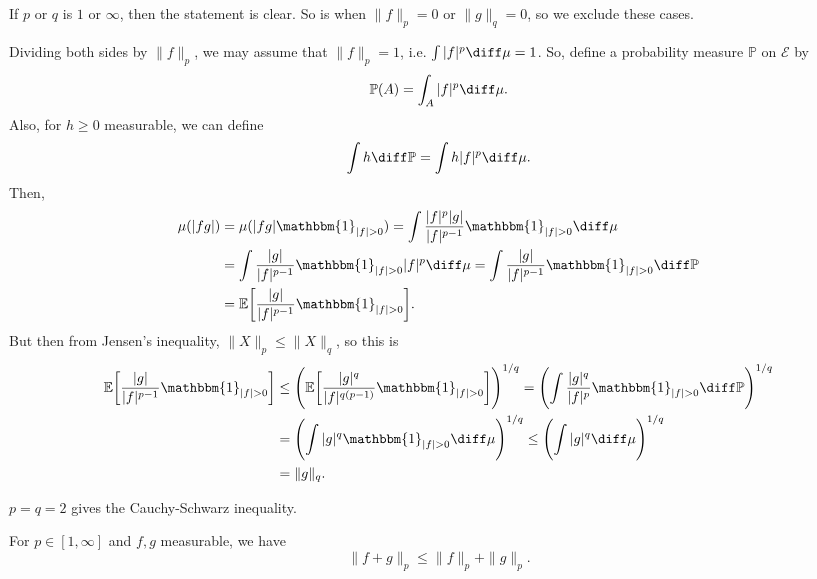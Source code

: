\documentclass[12pt]{article}
\begin{document}
\begin{proofbox}
	If $p$ or $q$ is $1$ or $\infty$, then the statement is clear. So is when $\|f\|_p = 0$ or $\|g\|_q = 0$, so we exclude these cases.

	Dividing both sides by $\|f\|_p$, we may assume that $\|f\|_p = 1$, i.e. $\int |f|^p \diff \mu = 1$. So, define a probability measure $\mathbb{P}$ on $\mathcal{E}$ by
	\[
	\mathbb{P}(A) = \int_A |f|^p \diff \mu.
	\]
	Also, for $h \geq 0$ measurable, we can define
	\[
	\int h \diff \mathbb{P} = \int h |f|^p \diff \mu.
	\]
	Then,
	\begin{align*}
		\mu(|fg|) &= \mu(|fg| \mathbbm{1}_{|f| > 0}) = \int \frac{|f|^p |g|}{|f|^{p-1}} \mathbbm{1}_{|f| > 0} \diff \mu \\
			  &= \int \frac{|g|}{|f|^{p-1}} \mathbbm{1}_{|f| > 0} |f|^p \diff \mu = \int \frac{|g|}{|f|^{p-1}} \mathbbm{1}_{|f| > 0} \diff \mathbb{P} \\
			  &= \mathbb{E}\biggl[ \frac{|g|}{|f|^{p-1}} \mathbbm{1}_{|f| > 0} \biggr].
	\end{align*}
	But then from Jensen's inequality, $\|X\|_p \leq \|X\|_q$, so this is
	\begin{align*}
		\mathbb{E}\biggl[ \frac{|g|}{|f|^{p-1}} \mathbbm{1}_{|f| > 0} \biggr] &\leq \Biggl( \mathbb{E}\biggl[ \frac{|g|^q}{|f|^{q(p-1)}} \mathbbm{1}_{|f| > 0} \biggr] \Biggr)^{1/q} = \Biggl( \int \frac{|g|^q}{|f|^{p}} \mathbbm{1}_{|f| > 0} \diff \mathbb{P} \Biggr)^{1/q} \\
										      &= \Biggl(\int |g|^q \mathbbm{1}_{|f| > 0} \diff \mu \Biggr)^{1/q} \leq \Biggl(\int |g|^q \diff \mu \Biggr)^{1/q} \\
										      &= \|g\|_q.
	\end{align*}
\end{proofbox}

\begin{remark}
	$p = q = 2$ gives the Cauchy-Schwarz inequality.
\end{remark}

\begin{theorem}
	For $p \in [1, \infty]$ and $f, g$ measurable, we have
	\[
	\|f+g\|_p \leq \|f\|_p + \|g\|_p.
	\]
\end{theorem}
\end{document}
